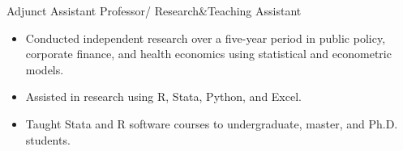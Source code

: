 \documentclass{resume}
\begin{document}
Adjunct Assistant Professor/ Research\&Teaching Assistant
\begin{itemize}
\item Conducted independent research over a five-year period in public policy, corporate finance, and health economics using statistical and econometric models.
\item Assisted in research using R, Stata, Python, and Excel.
\item Taught Stata and R software courses to undergraduate, master, and Ph.D. students.
\end{itemize}


  
\end{document}
